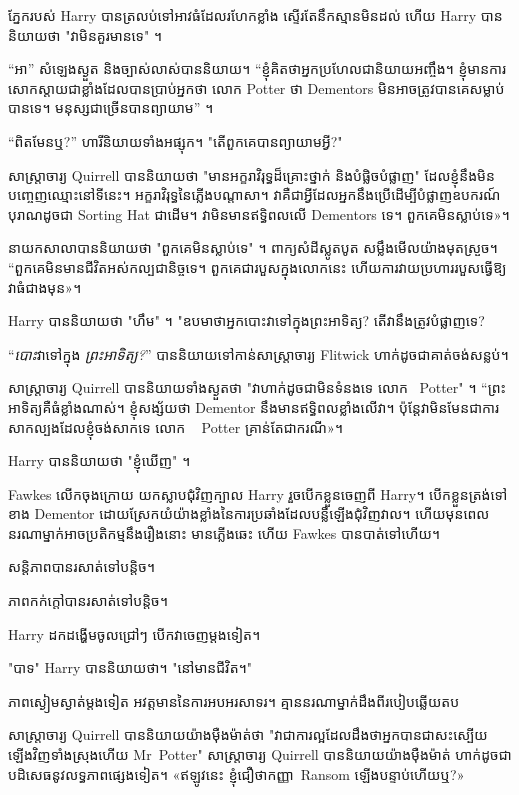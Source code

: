 {ភ្នែករបស់ Harry បានត្រលប់ទៅអាវធំដែលរហែកខ្លាំង ស្ទើរតែនឹកស្មានមិនដល់ ហើយ Harry បាននិយាយថា "វាមិនគួរមានទេ" ។

“អា” សំឡេងស្ងួត និងច្បាស់លាស់បាននិយាយ។ “ខ្ញុំគិតថាអ្នកប្រហែលជានិយាយអញ្ចឹង។ ខ្ញុំមានការសោកស្ដាយជាខ្លាំងដែលបានប្រាប់អ្នកថា លោក Potter ថា Dementors មិនអាចត្រូវបានគេសម្លាប់បានទេ។ មនុស្សជាច្រើនបានព្យាយាម” ។

“ពិតមែនឬ?” ហារី​និយាយ​ទាំង​អផ្សុក។ "តើពួកគេបានព្យាយាមអ្វី?"

សាស្ត្រាចារ្យ Quirrell បាននិយាយថា "មានអក្ខរាវិរុទ្ធដ៏គ្រោះថ្នាក់ និងបំផ្លិចបំផ្លាញ" ដែលខ្ញុំនឹងមិនបញ្ចេញឈ្មោះនៅទីនេះ។ អក្ខរាវិរុទ្ធនៃភ្លើងបណ្តាសា។ វាគឺជាអ្វីដែលអ្នកនឹងប្រើដើម្បីបំផ្លាញឧបករណ៍បុរាណដូចជា Sorting Hat ជាដើម។ វាមិនមានឥទ្ធិពលលើ Dementors ទេ។ ពួកគេ​មិន​ស្លាប់​ទេ»។

នាយកសាលាបាននិយាយថា "ពួកគេមិនស្លាប់ទេ" ។ ពាក្យសំដីស្លូតបូត សម្លឹងមើលយ៉ាងមុតស្រួច។ “ពួកគេមិនមានជីវិតអស់កល្បជានិច្ចទេ។ ពួក​គេ​ជា​របួស​ក្នុង​លោក​នេះ ហើយ​ការ​វាយ​ប្រហារ​របួស​ធ្វើ​ឱ្យ​វា​ធំ​ជាង​មុន»។

Harry បាននិយាយថា "ហឹម" ។ "ឧបមាថាអ្នកបោះវាទៅក្នុងព្រះអាទិត្យ? តើវានឹងត្រូវបំផ្លាញទេ?

“\emph{បោះ}វាទៅក្នុង \emph{ព្រះអាទិត្យ?}” បាននិយាយទៅកាន់សាស្រ្តាចារ្យ Flitwick ហាក់ដូចជាគាត់ចង់សន្លប់។

សាស្ត្រាចារ្យ Quirrell បាននិយាយទាំងស្ងួតថា "វាហាក់ដូចជាមិនទំនងទេ លោក~ Potter" ។ “ព្រះអាទិត្យគឺធំខ្លាំងណាស់។ ខ្ញុំសង្ស័យថា Dementor នឹងមានឥទ្ធិពលខ្លាំងលើវា។ ប៉ុន្តែ​វា​មិន​មែន​ជា​ការ​សាក​ល្បង​ដែល​ខ្ញុំ​ចង់​សាក​ទេ លោក ~ Potter គ្រាន់​តែ​ជា​ករណី»។

Harry បាននិយាយថា "ខ្ញុំឃើញ" ។

Fawkes លើក​ចុង​ក្រោយ យក​ស្លាប​ជុំវិញ​ក្បាល Harry រួច​បើក​ខ្លួន​ចេញ​ពី Harry។ បើក​ខ្លួន​ត្រង់​ទៅ​ខាង​ Dementor ដោយ​ស្រែក​យំ​យ៉ាង​ខ្លាំង​នៃ​ការ​ប្រឆាំង​ដែល​បន្លឺ​ឡើង​ជុំវិញ​វាល។ ហើយមុនពេលនរណាម្នាក់អាចប្រតិកម្មនឹងរឿងនោះ មានភ្លើងឆេះ ហើយ Fawkes បានបាត់ទៅហើយ។

សន្តិភាពបានរសាត់ទៅបន្តិច។

ភាពកក់ក្តៅបានរសាត់ទៅបន្តិច។

Harry ដកដង្ហើមចូលជ្រៅៗ បើកវាចេញម្តងទៀត។

"បាទ" Harry បាននិយាយថា។ "នៅមានជីវិត។"

ភាពស្ងៀមស្ងាត់ម្តងទៀត អវត្តមាននៃការអបអរសាទរ។ គ្មាននរណាម្នាក់ដឹងពីរបៀបឆ្លើយតប

សាស្ត្រាចារ្យ Quirrell បាននិយាយយ៉ាងម៉ឺងម៉ាត់ថា "វាជាការល្អដែលដឹងថាអ្នកបានជាសះស្បើយឡើងវិញទាំងស្រុងហើយ Mr~Potter" សាស្រ្តាចារ្យ Quirrell បាននិយាយយ៉ាងម៉ឺងម៉ាត់ ហាក់ដូចជាបដិសេធនូវលទ្ធភាពផ្សេងទៀត។ «ឥឡូវ​នេះ ខ្ញុំ​ជឿ​ថា​កញ្ញា~Ransom ឡើង​បន្ទាប់​ហើយ​ឬ?»

}
